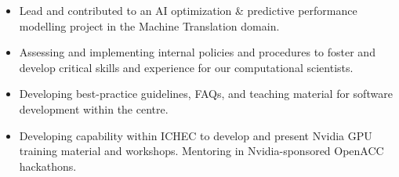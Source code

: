 \documentclass[11pt]{article}
\newenvironment{resumeSubSectionBody}{
    \par
    \vspace{-0.2\parskip}
    \begin{small}
    \par
} {
    \par
    \end{small}
    \par
}
\newenvironment{resumeItemize}{
    \vspace{-0.5\baselineskip}
    \begin{itemize}
} {
    \end{itemize}
}
\begin{document}
\begin{resumeSubSectionBody}
\begin{resumeItemize}
        \item
            Lead and contributed to an AI optimization \& predictive performance modelling project
            in the Machine Translation domain.

        \item
            Assessing and implementing internal policies and procedures to
            foster and develop critical skills and experience for our
            computational scientists.

        \item
            Developing best-practice guidelines, FAQs, and teaching material for
            software development within the centre.

        \item
            Developing capability within ICHEC to develop and present Nvidia GPU
            training material and workshops.
            Mentoring in Nvidia-sponsored OpenACC hackathons.
    \end{resumeItemize}
\end{resumeSubSectionBody}
\end{document}
